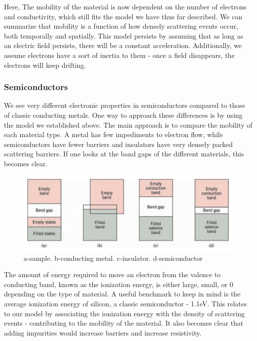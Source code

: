 \documentclass[11pt]{article}
\begin{document}
Here, The mobility of the material is now dependent on the number of electrons and conductivity, which still fits the model we have thus far described. We can summarize that mobility is a function of how densely scattering events occur, both temporally and spatially. This model persists by assuming that as long as an electric field persists, there will be a constant acceleration. Additionally, we assume electrons have a sort of inertia to them - once a field disappears, the electrons will keep drifting.

\subsubsection*{Semiconductors}
We see very different electronic properties in semiconductors compared to those of classic conducting metals. One way to approach these differences is by using the model we established above. The main approach is to compare the mobility of each material type. A metal has few impediments to electron flow, while semiconductors have fewer barriers and insulators have very densely packed scattering barriers. If one looks at the band gaps of the different materials, this becomes clear.
\begin{figure}[h]
	\centering
	\includegraphics[scale=0.7]{bands.png}
	\caption{a-sample. b-conducting metal. c-insulator. d-semiconductor}
\end{figure}

The amount of energy required to move an electron from the valence to conducting band, known as the ionization energy, is either large, small, or 0 depending on the type of material. A useful benchmark to keep in mind is the average ionization energy of silicon, a classic semiconductor - 1.1eV. This relates to our model by associating the ionization energy with the density of scattering events - contributing to the mobility of the material. It also becomes clear that adding impurities would increase barriers and increase resistivity.\\
\end{document}
